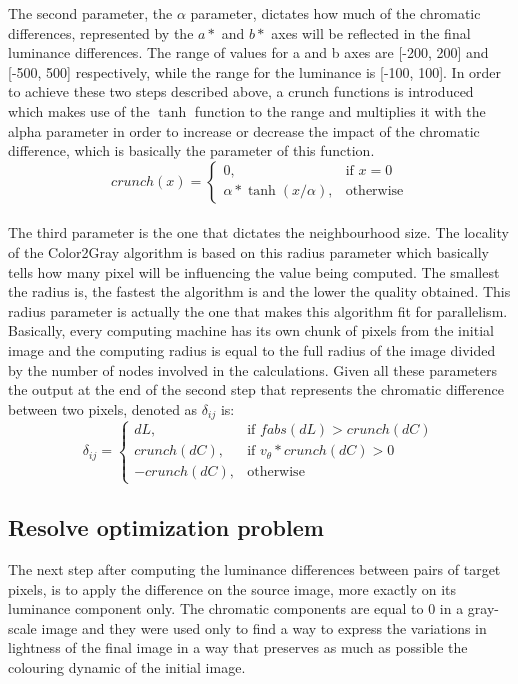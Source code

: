 \documentclass[conference]{IEEEtran}
\begin{document}
The second parameter, the $\alpha$ parameter, dictates how much of the chromatic differences, represented by the $\mathit{a*}$ and $\mathit{b*}$ axes will be reflected in the final luminance differences. The range of values for a and b axes are [-200, 200] and [-500, 500] respectively, while the range for the luminance is [-100, 100]. In order to achieve these two steps described above, a crunch functions is introduced which makes use of the $\tanh$ function to  the range and multiplies it with the alpha parameter in order to increase or decrease the impact of the chromatic difference, which is basically the parameter of this function.
\[ 
crunch(x) =
\begin{cases}
    0,							&\text{if } x=0\\
    \alpha * \tanh(x/\alpha),	& \text{otherwise}
\end{cases}
\]
\\
The third parameter is the one that dictates the neighbourhood size. The locality of the Color2Gray algorithm is based on this radius parameter which basically tells how many pixel will be influencing the value being computed. The smallest the radius is, the fastest the algorithm is and the lower the quality obtained. This radius parameter is actually the one that makes this algorithm fit for parallelism. Basically, every computing machine has its own chunk of pixels from the initial image and the computing radius is equal to the full radius of the image divided by the number of nodes involved in the calculations.
Given all these parameters the output at the end of the second step that represents the chromatic difference between two pixels, denoted as ${\delta_{ij}}$ is:
\[ 
\delta_{ij} =
\begin{cases}
    dL,			& \text{if } fabs(dL) > crunch(dC) \\
    crunch(dC),	& \text{if } v_\theta*crunch(dC) > 0 \\
    -crunch(dC),	& \text{otherwise}
\end{cases}
\]
\subsection{Resolve optimization problem}
The next step after computing the luminance differences between pairs of target pixels, is to apply the difference on the source image, more exactly on its luminance component only. The chromatic components are equal to 0 in a gray-scale image and they were used only to find a way to express the variations in lightness of the final image in a way that preserves as much as possible the colouring dynamic of the initial image.
\end{document}
